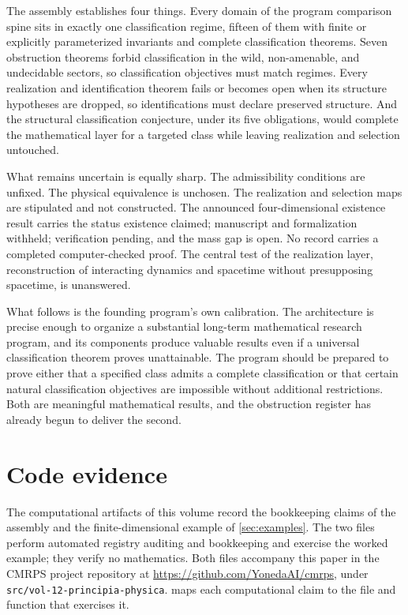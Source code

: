 \documentclass[11pt,letterpaper]{article}
\theoremstyle{definition}
\begin{document}
The assembly establishes four things. Every domain of the program comparison spine sits in exactly one classification regime, fifteen of them with finite or explicitly parameterized invariants and complete classification theorems. Seven obstruction theorems forbid classification in the wild, non-amenable, and undecidable sectors, so classification objectives must match regimes. Every realization and identification theorem fails or becomes open when its structure hypotheses are dropped, so identifications must declare preserved structure. And the structural classification conjecture, under its five obligations, would complete the mathematical layer for a targeted class while leaving realization and selection untouched.

What remains uncertain is equally sharp. The admissibility conditions are unfixed. The physical equivalence is unchosen. The realization and selection maps are stipulated and not constructed. The announced four-dimensional existence result carries the status existence claimed; manuscript and formalization withheld; verification pending, and the mass gap is open. No record carries a completed computer-checked proof. The central test of the realization layer, reconstruction of interacting dynamics and spacetime without presupposing spacetime, is unanswered.

What follows is the founding program's own calibration. The architecture is precise enough to organize a substantial long-term mathematical research program, and its components produce valuable results even if a universal classification theorem proves unattainable. The program should be prepared to prove either that a specified class admits a complete classification or that certain natural classification objectives are impossible without additional restrictions. Both are meaningful mathematical results, and the obstruction register has already begun to deliver the second.

\appendix
\section{Code evidence}
\label{app:code}

The computational artifacts of this volume record the bookkeeping claims of the assembly and the finite-dimensional example of \cref{sec:examples}. The two files perform automated registry auditing and bookkeeping and exercise the worked example; they verify no mathematics. Both files accompany this paper in the CMRPS project repository at \url{https://github.com/YonedaAI/cmrps}, under \texttt{src/vol-12-principia-physica}.  maps each computational claim to the file and function that exercises it.
\end{document}
